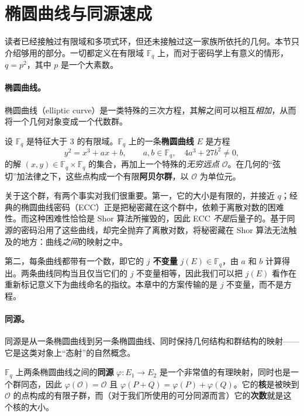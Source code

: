 \section{椭圆曲线与同源速成}

读者已经接触过有限域和多项式环，但还未接触过这一家族所依托的几何。本节只介绍够用的部分。一切都定义在有限域 $\mathbb{F}_q$ 上，而对于密码学上有意义的情形，$q = p^2$，其中 $p$ 是一个大素数。

\paragraph{椭圆曲线。}
椭圆曲线（elliptic curve）是一类特殊的三次方程，其解之间可以相互\emph{相加}，从而将一个几何对象变成一个代数群。

\begin{definition}[有限域上的椭圆曲线]
设 $\mathbb{F}_q$ 是特征大于 $3$ 的有限域。$\mathbb{F}_q$ 上的一条\textbf{椭圆曲线} $E$ 是方程
\[
  y^2 = x^3 + a x + b, \qquad a,b \in \mathbb{F}_q, \quad 4a^3 + 27b^2 \neq 0,
\]
的解 $(x,y) \in \mathbb{F}_q \times \mathbb{F}_q$ 的集合，再加上一个特殊的\emph{无穷远点} $\mathcal{O}$。在几何的“弦切”加法律之下，这些点构成一个有限\textbf{阿贝尔群}，以 $\mathcal{O}$ 为单位元。
\end{definition}

关于这个群，有两个事实对我们很重要。第一，它的大小是有限的，并接近 $q$；经典的椭圆曲线密码（ECC）正是把秘密藏在这个群中，依赖于离散对数的困难性。而这种困难性恰恰是 Shor 算法所摧毁的，因此 ECC \emph{不是}后量子的。基于同源的密码沿用了这些曲线，却完全抛弃了离散对数，将秘密藏在 Shor 算法无法触及的地方：曲线\emph{之间}的映射之中。

第二，每条曲线都带有一个数，即它的 \textbf{$j$ 不变量} $j(E) \in \mathbb{F}_q$，由 $a$ 和 $b$ 计算得出。两条曲线同构当且仅当它们的 $j$ 不变量相等，因此我们可以把 $j(E)$ 看作在重新标记意义下为曲线命名的指纹。本章中的方案传输的是 $j$ 不变量，而不是方程。

\paragraph{同源。}
同源是从一条椭圆曲线到另一条椭圆曲线、同时保持几何结构和群结构的映射——它是这类对象上“态射”的自然概念。

\begin{definition}[同源]
$\mathbb{F}_q$ 上两条椭圆曲线之间的\textbf{同源} $\varphi : E_1 \to E_2$ 是一个非常值的有理映射，同时也是一个群同态，因此 $\varphi(\mathcal{O}) = \mathcal{O}$ 且 $\varphi(P + Q) = \varphi(P) + \varphi(Q)$。它的\textbf{核}是被映到 $\mathcal{O}$ 的点构成的有限子群，而（对于我们所使用的可分同源而言）它的\textbf{次数}就是这个核的大小。
\end{definition}

